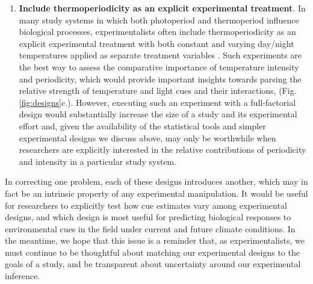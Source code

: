 \documentclass[11pt]{article}
\begin{document}
\begin{enumerate}
\item \textbf{Include thermoperiodicity as an explicit experimental treatment}. 
In many study systems in which both photoperiod and thermoperiod influence biological processes, experimentalists often include thermoperiodicity as an explicit experimental treatment with both constant and varying day/night temperatures applied as separate treatment variables \citep[e.g.,][]{Zaslavksi_1995}. Such experiments are the best way to assess the comparative importance of temperature intensity and periodicity, which would provide important insights towards parsing the relative strength of temperature and light cues and their interactions,  (Fig. \ref{fig:designs}c.). However, executing such an experiment with a full-factorial design would substantially increase the size of a study and its experimental effort and, given the availability of the statistical tools and simpler experimental designs we discuss above, may only be worthwhile when researchers are explicitly interested in the relative contributions of periodicity and intensity in a particular study system.
\end{enumerate}

In correcting one problem, each of these designs introduces another, which may in fact be an intrinsic property of any experimental manipulation. %
It would be useful for researchers to explicitly test how cue estimates vary among experimental designs, and which design is most useful for predicting biological responses to environmental cues in the field under current and future climate conditions. In the meantime, we hope that this issue is a reminder that, as experimentalists, we must continue to be thoughtful about matching our experimental designs to the goals of a study, and be transparent about uncertainty around our experimental inference.


\end{document}
